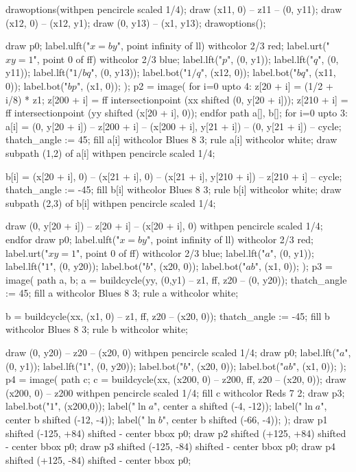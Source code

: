 \documentclass[oneside]{scrbook}
\begin{document}
    drawoptions(withpen pencircle scaled 1/4);
    draw (x11, 0) -- z11 -- (0, y11);
    draw (x12, 0) -- (x12, y1);
    draw (0, y13) -- (x1, y13);
    drawoptions();
  
    draw p0;
    label.ulft("$x=by$", point infinity of ll) withcolor 2/3 red;
    label.urt("$xy=1$", point 0 of ff) withcolor 2/3 blue;
    label.lft("$p$", (0, y1));
    label.lft("$q$", (0, y11));
    label.lft("$1/bq$", (0, y13));
    label.bot("$1/q$", (x12, 0));
    label.bot("$bq$", (x11, 0));
    label.bot("$bp$", (x1, 0));
);
p2 = image(
    for i=0 upto 4:
        z[20 + i] = (1/2 + i/8)  * z1;
        z[200 + i] = ff intersectionpoint (xx shifted (0, y[20 + i]));
        z[210 + i] = ff intersectionpoint (yy shifted (x[20 + i], 0));
    endfor
    path a[], b[];
    for i=0 upto 3:
        a[i] = (0, y[20 + i]) -- z[200 + i] -- (x[200 + i], y[21 + i]) -- (0, y[21 + i]) -- cycle;
        thatch_angle := 45;
        fill a[i] withcolor Blues 8 3; rule a[i] withcolor white; 
        draw subpath (1,2) of a[i] withpen pencircle scaled 1/4;
        
        b[i] = (x[20 + i], 0) -- (x[21 + i], 0) -- (x[21 + i], y[210 + i]) -- z[210 + i] -- cycle;
        thatch_angle := -45;
        fill b[i] withcolor Blues 8 3; rule b[i] withcolor white; 
        draw subpath (2,3) of b[i] withpen pencircle scaled 1/4;

        draw (0, y[20 + i]) -- z[20 + i] -- (x[20 + i], 0) withpen pencircle scaled 1/4;
    endfor
    draw p0;
    label.ulft("$x=by$", point infinity of ll) withcolor 2/3 red;
    label.urt("$xy=1$", point 0 of ff) withcolor 2/3 blue;
    label.lft("$a$", (0, y1));
    label.lft("$1$", (0, y20));
    label.bot("$b$", (x20, 0));
    label.bot("$ab$", (x1, 0));
);
p3 = image(
    path a, b;
    a = buildcycle(yy, (0,y1) -- z1, ff, z20 -- (0, y20));
    thatch_angle := 45;
    fill a withcolor Blues 8 3; rule a withcolor white; 

    b = buildcycle(xx, (x1, 0) -- z1, ff, z20 -- (x20, 0));
    thatch_angle := -45;
    fill b withcolor Blues 8 3; rule b withcolor white; 

    draw (0, y20) -- z20 -- (x20, 0) withpen pencircle scaled 1/4;
    draw p0;
    label.lft("$a$", (0, y1));
    label.lft("$1$", (0, y20));
    label.bot("$b$", (x20, 0));
    label.bot("$ab$", (x1, 0));
);
p4 = image(
    path c;
    c = buildcycle(xx, (x200, 0) -- z200, ff, z20 -- (x20, 0));
    draw (x200, 0) -- z200 withpen pencircle scaled 1/4;
    fill c withcolor Reds 7 2;
    draw p3;
    label.bot("$1$", (x200,0));
    label("$\ln a$", center a shifted (-4, -12));
    label("$\ln a$", center b shifted (-12, -4));
    label("$\ln b$", center b shifted (-66, -4));
);
draw p1 shifted (-125, +84) shifted - center bbox p0;
draw p2 shifted (+125, +84) shifted - center bbox p0; 
draw p3 shifted (-125, -84) shifted - center bbox p0; 
draw p4 shifted (+125, -84) shifted - center bbox p0; 
\end{document}
